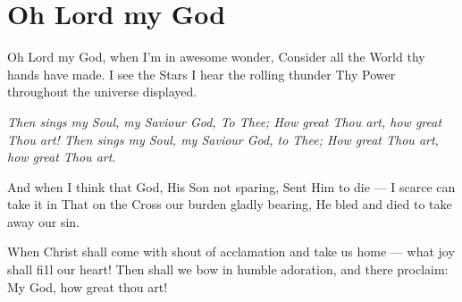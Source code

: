\chapter{Oh Lord my God}
\startlines
{\sc Oh Lord} my God, when I'm in awesome wonder,
Consider all the World thy hands have made.
I see the Stars I hear the rolling thunder
Thy Power throughout the universe displayed.
 
{\it Then sings my Soul, my Saviour God, To Thee;
How great Thou art, how great Thou art!
Then sings my Soul, my Saviour God, to Thee;
How great Thou art, how great Thou art.}    

And when I think that God, His Son not sparing,
Sent Him to die --- I scarce can take it in
That on the Cross our burden gladly bearing,
He bled and died to take away our sin. 

When Christ shall come with shout of acclamation
and take us home --- what joy shall fi1l our heart!
Then shall we bow in humble adoration,
and there proclaim: My God, how great thou art!
\stoplines
